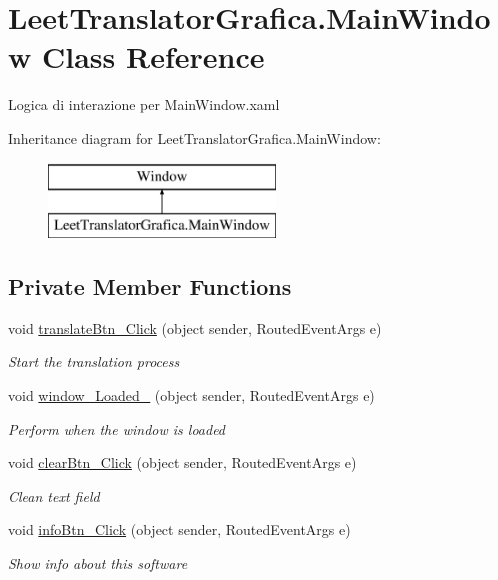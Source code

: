 \hypertarget{class_leet_translator_grafica_1_1_main_window}{}\section{Leet\+Translator\+Grafica.\+Main\+Window Class Reference}
\label{class_leet_translator_grafica_1_1_main_window}


Logica di interazione per Main\+Window.\+xaml  


Inheritance diagram for Leet\+Translator\+Grafica.\+Main\+Window\+:\begin{figure}[H]
\begin{center}
\leavevmode
\includegraphics[height=2.000000cm]{class_leet_translator_grafica_1_1_main_window}
\end{center}
\end{figure}
\subsection*{Private Member Functions}
\begin{DoxyCompactItemize}
\item 
void \mbox{\hyperlink{class_leet_translator_grafica_1_1_main_window_a421197948c143ef1794985b934dff9b1}{translate\+Btn\+\_\+\+Click}} (object sender, Routed\+Event\+Args e)
\begin{DoxyCompactList}\small\item\em Start the translation process \end{DoxyCompactList}\item 
void \mbox{\hyperlink{class_leet_translator_grafica_1_1_main_window_aceeed66386ce7e420d4664e9d216f77c}{window\+\_\+\+Loaded\+\_}} (object sender, Routed\+Event\+Args e)
\begin{DoxyCompactList}\small\item\em Perform when the window is loaded \end{DoxyCompactList}\item 
void \mbox{\hyperlink{class_leet_translator_grafica_1_1_main_window_a42997ac15b81e590c852a728d2959ee9}{clear\+Btn\+\_\+\+Click}} (object sender, Routed\+Event\+Args e)
\begin{DoxyCompactList}\small\item\em Clean text field \end{DoxyCompactList}\item 
void \mbox{\hyperlink{class_leet_translator_grafica_1_1_main_window_a4a643cadb0b1b10c0e7489d007c088a2}{info\+Btn\+\_\+\+Click}} (object sender, Routed\+Event\+Args e)
\begin{DoxyCompactList}\small\item\em Show info about this software \end{DoxyCompactList}\end{DoxyCompactItemize}


